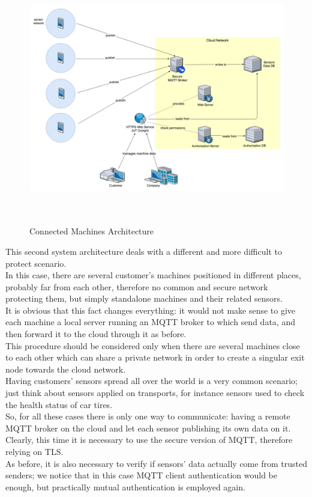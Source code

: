 \documentclass[12pt]{report}
\begin{document}
{{\begin{figure}[H]
\includegraphics[width=14cm,height=11cm,keepaspectratio]{connectedmachines_architecture}
\centering
\caption{Connected Machines Architecture}
\label{ssec:connectedmachines}
\end{figure}

This second system architecture deals with a different and more difficult to protect scenario.\\
In this case, there are several customer's machines positioned in different places, probably far from each other, therefore no common and secure network protecting them, but simply standalone machines and their related sensors.\\
It is obvious that this fact changes everything: it would not make sense to give each machine a local server running an MQTT broker to which send data, and then forward it to the cloud through it as before.\\
This procedure should be considered only when there are several machines close to each other which can share a private network in order to create a singular exit node towards the cloud network.\\

Having customers' sensors spread all over the world is a very common scenario; just think about sensors applied on transports, for instance sensors used to check the health status of car tires.\\

So, for all these cases there is only one way to communicate: having a remote MQTT broker on the cloud and let each sensor publishing its own data on it.\\
Clearly, this time it is necessary to use the secure version of MQTT, therefore relying on TLS.\\
As before, it is also necessary to verify if sensors' data actually come from trusted senders; we notice that in this case MQTT client authentication would be enough, but practically mutual authentication is employed again.

}}
\end{document}
